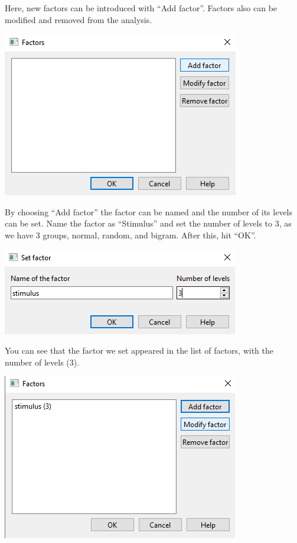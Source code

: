 \documentclass[
]{book}
\begin{document}
Here, new factors can be introduced with ``Add factor''. Factors also can be modified and removed from the analysis.

\includegraphics{img/ch9/9.4CRMVAG_addfactor.png}

By choosing ``Add factor'' the factor can be named and the number of its levels can be set. Name the factor as ``Stimulus'' and set the number of levels to 3, as we have 3 groups, normal, random, and bigram. After this, hit ``OK''.

\includegraphics{img/ch9/9.4CRMVAG_setfactor.png}

You can see that the factor we set appeared in the list of factors, with the number of levels (3).

\includegraphics{img/ch9/9.4CRMVAG_factorsset.png}
\end{document}
